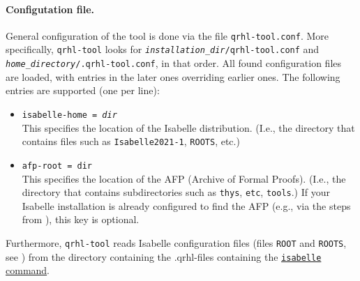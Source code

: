 \documentclass{article}
\begin{document}
\paragraph{Configutation file.}%
General configuration of the tool is done via the file \texttt{qrhl-tool.conf}.
More specifically, \texttt{qrhl-tool} looks for \texttt{\textnormal{\textit{installation\_dir}}/qrhl-tool.conf} and
\texttt{\textnormal{\textit{home\_directory}}/.qrhl-tool.conf}, in that order.
All found configuration files are loaded, with entries in the later ones overriding earlier ones.
The following entries are supported (one per line):
\begin{itemize}
\item \texttt{isabelle-home = \textnormal{\textit{dir}}} \\
  This specifies the location of the Isabelle distribution.
  (I.e., the directory that contains files such as \texttt{Isabelle2021-1}, \texttt{ROOTS}, etc.)
\item \texttt{afp-root = \textnormal{\texttt{dir}}} \\
  This specifies the location of the AFP (Archive of Formal Proofs).
  (I.e., the directory that contains subdirectories such as \texttt{thys}, \texttt{etc}, \texttt{tools}.)
  If your Isabelle installation is already configured to find the AFP (e.g., via the steps from \cite{using-afp}), this key is optional.
\end{itemize}
Furthermore, \texttt{qrhl-tool} reads Isabelle configuration files (files \texttt{ROOT} and \texttt{ROOTS}, see \cite{isabelle-system}) from the directory containing the .qrhl-files containing the \hyperref[command:isabelle]{\texttt{isabelle} command}.
\end{document}

